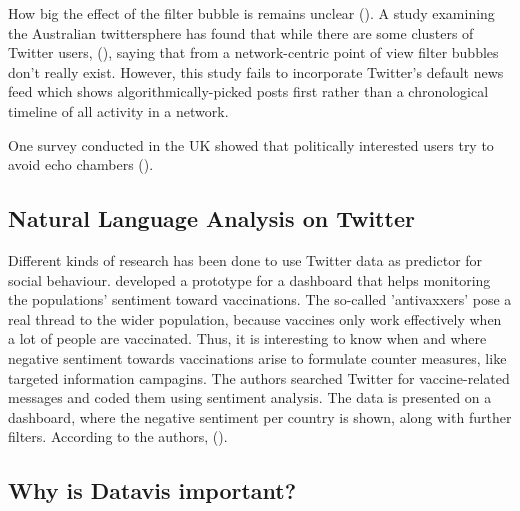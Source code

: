How big the effect of the filter bubble is remains unclear (\cite{bruns_echo_2017}). A study examining the Australian twittersphere has found that while there are some clusters of Twitter users,  (\cite[9]{bruns_echo_2017}), saying that from a network-centric point of view filter bubbles don't really exist. However, this study fails to incorporate Twitter's default news feed which shows algorithmically-picked posts first rather than a chronological timeline of all activity in a network.

One survey conducted in the UK showed that politically interested users try to avoid echo chambers (\cite{dubois_echo_2018}). 



\subsection{Natural Language Analysis on Twitter}

Different kinds of research has been done to use Twitter data as predictor for social behaviour. \citeauthor{bahk2016publicly} developed a prototype for a dashboard that helps monitoring the populations' sentiment toward vaccinations. The so-called 'antivaxxers' pose a real thread to the wider population, because vaccines only work effectively when a lot of people are vaccinated. Thus, it is interesting to know when and where negative sentiment towards vaccinations arise to formulate counter measures, like targeted information campagins. The authors searched Twitter for vaccine-related messages and coded them using sentiment analysis. The data is presented on a dashboard, where the negative sentiment per country is shown, along with further filters. According to the authors,  (\cite[343]{bahk2016publicly}). 


\subsection{Why is Datavis important?}

